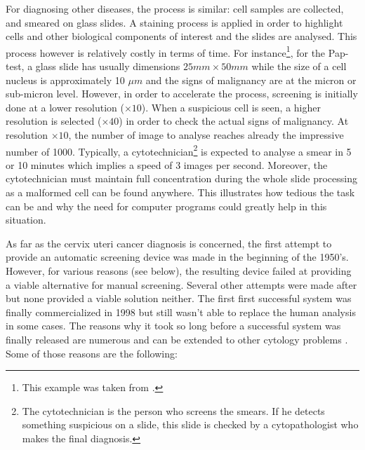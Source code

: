 For diagnosing other diseases, the process is similar: cell samples are collected, and smeared on glass slides. A staining process is applied in order to highlight cells and other biological components of interest and the slides are analysed. This process however is relatively costly in terms of time. For instance\footnote{This example was taken from \cite{bengtsson2014screening}.}, for the Pap-test, a glass slide has usually dimensions $25mm \times 50mm$ while the size of a cell nucleus is approximately 10 $\mu m$ and the signs of malignancy are at the micron or sub-micron level. However, in order to accelerate the process, screening is initially done at a lower resolution ($\times 10$). When a suspicious cell is seen, a higher resolution is selected ($\times 40$) in order to check the actual signs of malignancy. 
At resolution $\times 10$, the number of image to analyse reaches already the impressive number of 1000. Typically, a cytotechnician\footnote{The cytotechnician is the person who screens the smears. If he detects something suspicious on a slide, this slide is checked by a cytopathologist who makes the final diagnosis.} is expected to analyse a smear in 5 or 10 minutes which implies a speed of 3 images per second. Moreover, the cytotechnician must maintain full concentration during the whole slide processing as a malformed cell can be found anywhere. This illustrates how tedious the task can be and why the need for computer programs could greatly help in this situation. 

As far as the cervix uteri cancer diagnosis is concerned, the first attempt to provide an automatic screening device was made in the beginning of the 1950's. However, for various reasons (see below), the resulting device failed at providing a viable alternative for manual screening. Several other attempts were made after but none provided a viable solution neither. The first first successful system was finally commercialized in 1998 but still wasn't able to replace the human analysis in some cases. The reasons why it took so long before a successful system was finally released are numerous and can be extended to other cytology problems \cite{bengtsson2014screening}. Some of those reasons are the following:

